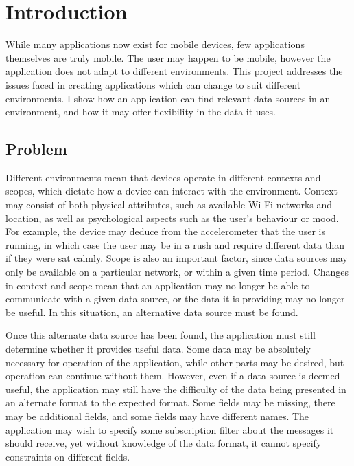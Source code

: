 \documentclass[12pt,twoside,notitlepage]{report}
\begin{document}
\tableofcontents

\listoffigures

\newpage


\cleardoublepage        %

\setcounter{page}{1}
\pagestyle{headings}

\chapter{Introduction}

While many applications now exist for mobile devices, few applications themselves are truly mobile. 
The user may happen to be mobile, however the application does not adapt to different environments. 
This project addresses the issues faced in creating applications which can change to suit different environments. 
I show how an application can find relevant data sources in an environment, and how it may offer flexibility in the data it uses.

\section{Problem}
Different environments mean that devices operate in different contexts and scopes, which dictate how a device can interact with the environment. 
Context may consist of both physical attributes, such as available Wi-Fi networks and location, as well as psychological aspects such as the user's behaviour or mood.
For example, the device may deduce from the accelerometer that the user is running, in which case the user may be in a rush and require different data than if they were sat calmly.
Scope is also an important factor, since data sources may only be available on a particular network, or within a given time period. 
Changes in context and scope mean that an application may no longer be able to communicate with a given data source, or the data it is providing may no longer be useful. 
In this situation, an alternative data source must be found.

Once this alternate data source has been found, the application must still determine whether it provides useful data. 
Some data may be absolutely necessary for operation of the application, while other parts may be desired, but operation can continue without them. 
However, even if a data source is deemed useful, the application may still have the difficulty of the data being presented in an alternate format to the expected format. 
Some fields may be missing, there may be additional fields, and some fields may have different names. 
The application may wish to specify some subscription filter about the messages it should receive, yet without knowledge of the data format, it cannot specify constraints on different fields.
\end{document}
